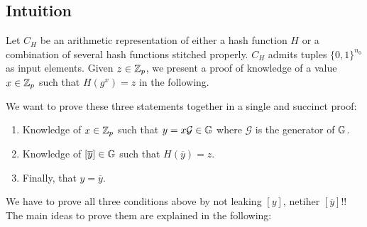 \subsection{Intuition}

Let $C_H$ be an arithmetic representation of either a hash function $H$ or a combination of several hash functions stitched properly. $C_H$ admits tuples $\{0,1\}^{n_0}$ as input elements. 
Given $z \in \mathbb{Z}_p$, we present a proof of knowledge of a value $x\in \mathbb{Z}_p$ such that $H(g^x)=z$ in the following.

We want to prove these three statements together in a single and succinct proof:
\begin{enumerate}
	\item Knowledge of $x \in \mathbb{Z}_p$ such that $y=x \mathcal{G}\in \mathbb{G}$ where $\mathcal{G}$ is the generator of $\mathbb{G}$. 
	\item Knowledge of $[\overline{y}] \in \mathbb{G}$ such that $H(\overline{y})=z$. 
	\item Finally, that $y=\overline{y}$.
\end{enumerate}
We have to prove all three conditions above by not leaking $[y]$, netiher $[\overline{y}]$!! The main ideas to prove them are explained in the following:
